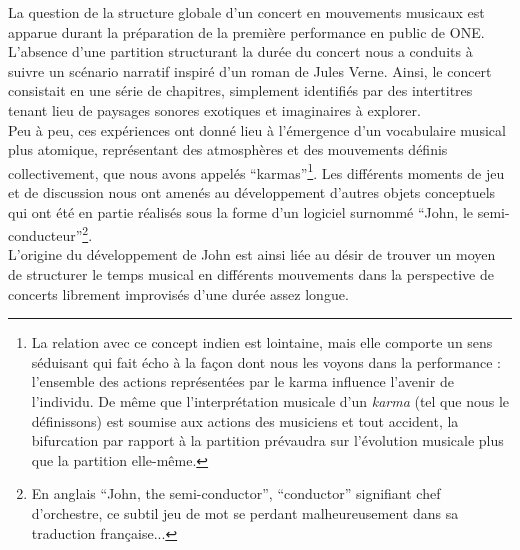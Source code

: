 \noindent La question de la structure globale d'un concert en mouvements musicaux est apparue durant la préparation de la première performance en public de ONE. L'absence d'une partition structurant la durée du concert nous a conduits à suivre un scénario narratif inspiré d'un roman de Jules Verne. Ainsi, le concert consistait en une série de chapitres, simplement identifiés par des intertitres tenant lieu de paysages sonores exotiques et imaginaires à explorer.\\
\indent Peu à peu, ces expériences ont donné lieu à l'émergence d'un vocabulaire musical plus atomique, représentant des atmosphères et des mouvements définis collectivement, que nous avons appelés ``karmas''\footnote{La relation avec ce concept indien est lointaine, mais elle comporte un sens séduisant qui fait écho à la façon dont nous les voyons dans la performance : l'ensemble des actions représentées par le karma influence l'avenir de l'individu. De même que l'interprétation musicale d'un \textit{karma} (tel que nous le définissons) est soumise aux actions des musiciens et tout accident, la bifurcation par rapport à la partition prévaudra sur l'évolution musicale plus que la partition elle-même.}. Les différents moments de jeu et de discussion nous ont amenés au développement d'autres objets conceptuels qui ont été en partie réalisés sous la forme d'un logiciel surnommé ``John, le semi-conducteur''\footnote{En anglais ``John, the semi-conductor'', ``conductor'' signifiant chef d'orchestre, ce subtil jeu de mot se perdant malheureusement dans sa traduction française...}.\\
\indent L'origine du développement de John est ainsi liée au désir de trouver un moyen de structurer le temps musical en différents mouvements dans la perspective de concerts librement improvisés d'une durée assez longue. 

